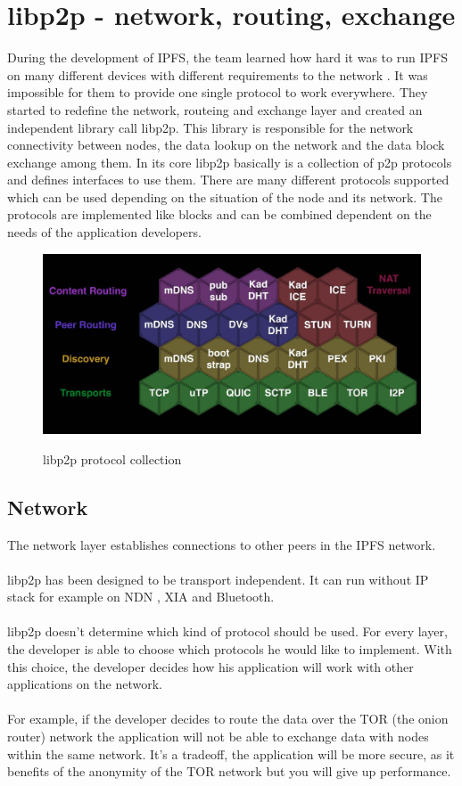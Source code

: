 \documentclass[a4paper,11pt, oneside]{report}
\theoremstyle{definition}
\begin{document}
\newpage
\section{libp2p - network, routing, exchange}
During the development of IPFS, the team learned how hard it was to run IPFS on many different devices with different requirements to the network \cite{libp2pissues}. It was impossible for them to provide one single protocol to work everywhere. They started to redefine the network, routeing and exchange layer and created an independent library call libp2p. This library is responsible for the network connectivity between nodes, the data lookup on the network and the data block exchange among them. In its core libp2p basically is a collection of p2p protocols and defines interfaces to use them. There are many different protocols supported which can be used depending on the situation of the node and its network. The protocols are implemented like blocks and can be combined dependent on the needs of the application developers.
\begin{figure}[H]
\centering
\includegraphics[width=\textwidth]{img/libp2p-blocks.png}\\[0.2cm]
\caption[libp2p]{libp2p protocol collection}
\end{figure}
\noindent


\newpage
\subsection{Network}
The network layer establishes connections to other peers in the IPFS network.\\ \\
libp2p has been designed to be transport independent. It can run without IP stack for example on NDN \cite{ndn}, XIA \cite{xia} and Bluetooth\cite{libp2pnoip}.\\ \\
libp2p doesn't determine which kind of protocol should be used. For every layer, the developer is able to choose which protocols he would like to implement. With this choice, the developer decides how his application will work with other applications on the network.\\ \\
For example, if the developer decides to route the data over the TOR (the onion router) network the application will not be able to exchange data with nodes within the same network. It's a tradeoff, the application will be more secure, as it benefits of the anonymity of the TOR network but you will give up performance. 
\end{document}

